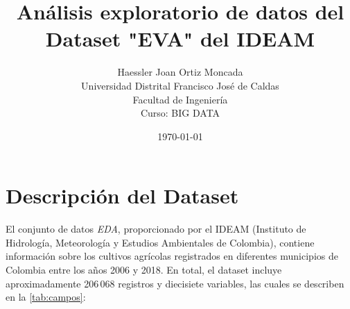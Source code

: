 \documentclass[12pt,a4paper]{article}
\title{\textbf{Análisis exploratorio de datos del Dataset "EVA" del IDEAM}}
\author{Haessler Joan Ortiz Moncada \\[0.5cm]
        Universidad Distrital Francisco José de Caldas \\
        Facultad de Ingeniería \\
        Curso: BIG DATA}
\date{\today}
\begin{document}
\maketitle

\section{Descripción del Dataset}
El conjunto de datos \textit{EDA}, proporcionado por el IDEAM (Instituto de Hidrología, Meteorología y Estudios Ambientales de Colombia), 
contiene información sobre los cultivos agrícolas registrados en diferentes municipios de Colombia entre los años 2006 y 2018. 
En total, el dataset incluye aproximadamente 206\,068 registros y diecisiete variables, las cuales se describen en la \cref{tab:campos}:
\end{document}
